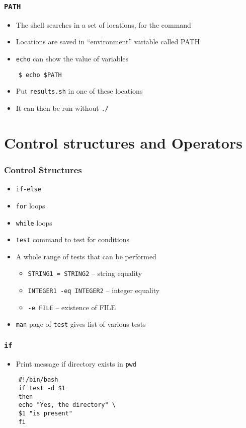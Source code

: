 \documentclass[12pt,compress]{beamer}
\begin{document}
\begin{frame}[fragile]
  \frametitle{\texttt{PATH}}
  \begin{itemize}
  \item The shell searches in a set of locations, for the command 
  \item Locations are saved in ``environment'' variable called PATH
  \item \texttt{echo} can show the value of variables
  \end{itemize}
  \begin{lstlisting}
    $ echo $PATH
  \end{lstlisting} %
  \begin{itemize}
  \item Put \texttt{results.sh} in one of these locations
  \item It can then be run without \texttt{./} 
  \end{itemize}
\end{frame}

\section{Control structures and Operators}
\begin{frame}[fragile]
  \frametitle{Control Structures}
  \begin{itemize}
  \item \texttt{if-else}
  \item \texttt{for} loops
  \item \texttt{while} loops
  \end{itemize}
  \begin{itemize}
  \item \texttt{test} command to test for conditions
  \item A whole range of tests that can be performed
    \begin{itemize}
    \item \texttt{STRING1 = STRING2} -- string equality
    \item \texttt{INTEGER1 -eq INTEGER2} -- integer equality
    \item \texttt{-e FILE} -- existence of FILE 
    \end{itemize}
  \item \texttt{man} page of \texttt{test} gives list of various tests
  \end{itemize}
\end{frame}

\begin{frame}[fragile]
  \frametitle{\texttt{if}}
  \begin{itemize}
  \item Print message if directory exists in \texttt{pwd}
  \end{itemize}
  \begin{lstlisting}
    #!/bin/bash
    if test -d $1
    then
    echo "Yes, the directory" \
    $1 "is present"
    fi
  \end{lstlisting} %
\end{frame}
\end{document}
